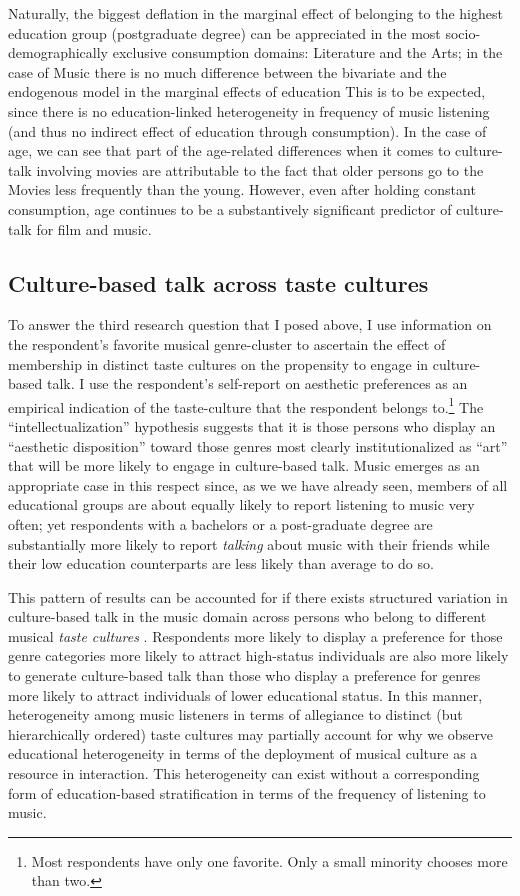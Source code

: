 \documentclass[11pt]{article}
\begin{document}
Naturally, the biggest deflation in the marginal effect of belonging to the highest education group (postgraduate degree) can be appreciated in the most socio-demographically exclusive consumption domains: Literature and the Arts; in the case of Music there is no much difference between the bivariate and the endogenous model in the marginal effects of education  This is to be expected, since there is no education-linked heterogeneity in frequency of music listening (and thus no indirect effect of education through consumption). In the case of age, we can see that part of the age-related differences when it comes to culture-talk involving movies are attributable to the fact that older persons go to the Movies less frequently than the young.  However, even after holding constant consumption, age continues to be a substantively significant predictor of culture-talk for film and music.  

\subsection{Culture-based talk across taste cultures}
To answer the third research question that I posed above, I use information on the respondent's favorite musical genre-cluster to ascertain the effect of membership in distinct taste cultures on the propensity to engage in culture-based talk.  I use the respondent's self-report on aesthetic preferences as an empirical indication of the taste-culture that the respondent belongs to.\footnote{Most respondents have only one favorite. Only a small minority chooses more than two.}  The ``intellectualization'' hypothesis suggests that it is those persons who display an ``aesthetic disposition'' \citep[3]{bourdieu84} toward those genres most clearly institutionalized as ``art'' that will be more likely to engage in culture-based talk.   Music emerges as an appropriate case in this respect since, as we we have already seen, members of all educational groups are about equally likely to report listening to music very often; yet respondents with a bachelors or a post-graduate degree are substantially more likely to report \emph{talking} about music with their friends while their low education counterparts are less likely than average to do so. 

This pattern of results can be accounted for if there exists structured variation in culture-based talk in the music domain across persons who belong to different musical \emph{taste cultures} \citep{gans99}.  Respondents more likely to display a preference for those genre categories more likely to attract high-status individuals are also more likely to generate culture-based talk than those who display a preference for genres more likely to attract individuals of lower educational status. In this manner, heterogeneity among music listeners in terms of allegiance to distinct (but hierarchically ordered) taste cultures may partially account for why we observe educational heterogeneity in terms of the deployment of musical culture as a resource in interaction.  This heterogeneity can exist without a corresponding form of education-based stratification in terms of the frequency of listening to music.   
\end{document}
